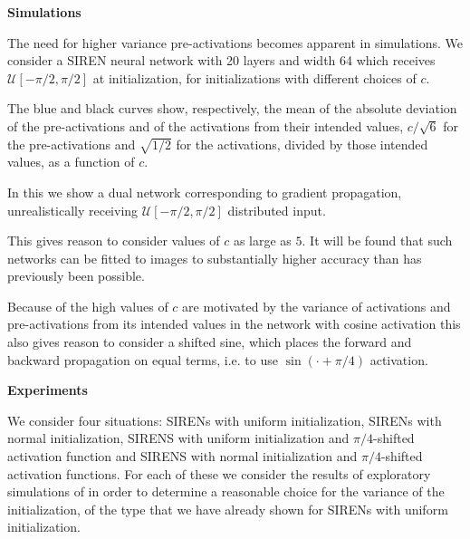 \documentclass{letter}
\begin{document}
{\bf Simulations}

The need for higher variance pre-activations becomes apparent in simulations. We consider a SIREN neural network with 20 layers and width 64 which receives $\mathcal{U}[-\pi/2,\pi/2]$ at initialization, for initializations with different choices of $c$.

The blue and black curves show, respectively, the mean of the absolute deviation of the pre-activations and of the activations from their intended values, $c/\sqrt{6}$ for the pre-activations and $\sqrt{1/2}$ for the activations, divided by those intended values, as a function of $c$.

\begin{center}

\end{center}

In this we show a dual network corresponding to gradient propagation, unrealistically receiving $\mathcal{U}[-\pi/2,\pi/2]$ distributed input.

\begin{center}

\end{center}

This gives reason to consider values of $c$ as large as $5$. It will be found that such networks can be fitted to images to substantially higher accuracy than has previously been possible.

Because of the high values of $c$ are motivated by the variance of activations and pre-activations from its intended values in the network with cosine activation this also gives reason to consider a shifted sine, which places the forward and backward propagation on equal terms, i.e. to use $\sin(\cdot+\pi/4)$ activation.


{\bf Experiments}

We consider four situations: SIRENs with uniform initialization, SIRENs with normal initialization, SIRENS with uniform initialization and $\pi/4$-shifted activation function and SIRENS with normal initialization and $\pi/4$-shifted activation functions. For each of these we consider the results of exploratory simulations of in order to determine a reasonable choice for the variance of the initialization, of the type that we have already shown for SIRENs with uniform initialization.
\end{document}
